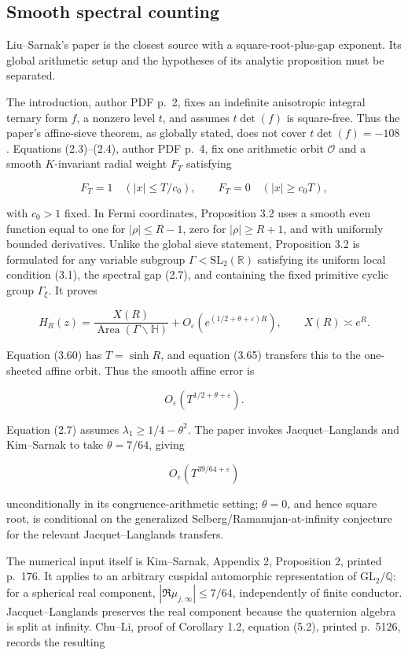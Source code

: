 \subsection{Smooth spectral counting}\label{koide-lit-smooth-spectral-counting}

Liu--Sarnak's paper is the closest source with a square-root-plus-gap exponent. Its global arithmetic setup and the hypotheses of its analytic proposition must be separated.

The introduction, author PDF p.~2, fixes an indefinite anisotropic integral ternary form \(f\), a nonzero level \(t\), and assumes \(t\det(f)\) is square-free. Thus the paper's affine-sieve theorem, as globally stated, does not cover \(t\det(f)=-108\). Equations (2.3)--(2.4), author PDF p.~4, fix one arithmetic orbit \(\mathcal O\) and a smooth \(K\)-invariant radial weight \(F_T\) satisfying

\[
 F_T=1\quad(|x|\leq T/c_0),
 \qquad
 F_T=0\quad(|x|\geq c_0T),
\]

with \(c_0>1\) fixed. In Fermi coordinates, Proposition 3.2 uses a smooth even function equal to one for \(|\rho|\leq R-1\), zero for \(|\rho|\geq R+1\), and with uniformly bounded derivatives. Unlike the global sieve statement, Proposition 3.2 is formulated for any variable subgroup \(\Gamma<\mathrm{SL}_2(\mathbb R)\) satisfying its uniform local condition (3.1), the spectral gap (2.7), and containing the fixed primitive cyclic group \(\Gamma_\xi\). It proves

\[
 H_R(z)=\frac{X(R)}{\operatorname{Area}(\Gamma\backslash\mathbb H)}
 +O_\varepsilon(e^{(1/2+\theta+\varepsilon)R}),
 \qquad X(R)\asymp e^R.
\]

Equation (3.60) has \(T=\sinh R\), and equation (3.65) transfers this to the one-sheeted affine orbit. Thus the smooth affine error is

\[
 O_\varepsilon(T^{1/2+\theta+\varepsilon}).
\]

Equation (2.7) assumes \(\lambda_1\geq1/4-\theta^2\). The paper invokes Jacquet--Langlands and Kim--Sarnak to take \(\theta=7/64\), giving

\[
 O_\varepsilon(T^{39/64+\varepsilon})
\]

unconditionally in its congruence-arithmetic setting; \(\theta=0\), and
hence square root, is conditional on the generalized
Selberg/Ramanujan-at-infinity conjecture for the relevant
Jacquet--Langlands transfers.

The numerical input itself is Kim--Sarnak, Appendix 2, Proposition 2, printed p.~176. It applies to an arbitrary cuspidal automorphic representation of \(\mathrm{GL}_2/\mathbb Q\): for a spherical real component, \(|\Re\mu_{j,\infty}|\leq7/64\), independently of finite conductor. Jacquet--Langlands preserves the real component because the quaternion algebra is split at infinity. Chu--Li, proof of Corollary 1.2, equation (5.2), printed p.~5126, records the resulting

